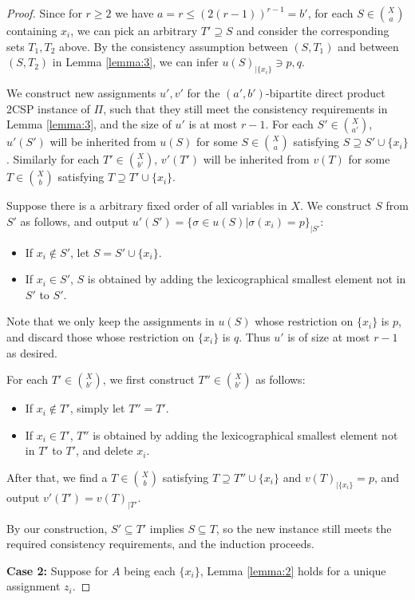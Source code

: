 \documentclass[10pt,a4paper]{article}
\begin{document}
\begin{proof}
    Since for $r\ge 2$ we have $a=r\le (2(r-1))^{r-1}=b'$, for each $S \in \binom{X}{a}$ containing $x_i$, we can pick an arbitrary $T'\supseteq S$ and consider the corresponding sets $T_1,T_2$ above. By the consistency assumption between $(S,T_1)$ and between $(S,T_2)$ in Lemma \ref{lemma:3}, we can infer $u(S)_{|\{x_i\}}\ni p,q$.

    We construct new assignments $u',v'$ for the $(a',b')$-bipartite direct product 2CSP instance of $\Pi$, such that they still meet the consistency requirements in Lemma \ref{lemma:3}, and the size of $u'$ is at most $r-1$. For each $S' \in \binom{X}{a'}$, $u'(S')$ will be inherited from $u(S)$ for some $S \in \binom{X}{a}$ satisfying $S \supseteq S'\cup\{x_i\}$. Similarly for each $T' \in \binom{X}{b'}$, $v'(T')$ will be inherited from $v(T)$ for some $T \in \binom{X}{b}$ satisfying $T \supseteq T'\cup\{x_i\}$. 

    Suppose there is a arbitrary fixed order of all variables in $X$. We construct $S$ from $S'$ as follows, and output $u'(S')=\{\sigma \in u(S)|\sigma(x_i)=p\}_{|S'}$:
    \begin{itemize}
        \item If $x_i \not\in S'$, let $S=S'\cup \{x_i\}$.
        \item If $x_i \in S'$, $S$ is obtained by adding the lexicographical smallest element not in $S'$ to $S'$.
    \end{itemize}
    Note that we only keep the assignments in $u(S)$ whose restriction on $\{x_i\}$ is $p$, and discard those whose restriction on $\{x_i\}$ is $q$. Thus $u'$ is of size at most $r-1$ as desired.

    For each $T' \in \binom{X}{b'}$, we first construct $T''\in \binom{X}{b'}$ as follows:
    \begin{itemize}
        \item If $x_i \notin T'$, simply let $T''=T'$.
        \item If $x_i \in T'$, $T''$ is obtained by adding the lexicographical smallest element not in $T'$ to $T'$, and delete $x_i$.
    \end{itemize}
    After that, we find a $T \in \binom{X}{b}$ satisfying $T \supseteq T'' \cup \{x_i\}$ and $v(T)_{|\{x_i\}}=p$, and output $v'(T')=v(T)_{|T'}$.

    By our construction, $S' \subseteq T'$ implies $S \subseteq T$, so the new instance still meets the required consistency requirements, and the induction proceeds.

\medskip\noindent\textbf{Case 2:} Suppose for $A$ being each $\{x_i\}$, Lemma \ref{lemma:2} holds for a unique assignment $z_i$. 


\end{proof}
\end{document}
